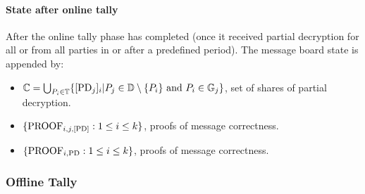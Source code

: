 \documentclass{article}
\begin{document}
\paragraph{State after online tally}

After the online tally phase has completed (once it received partial decryption for all \SetOfEncryptedPartialDecryptionKeys{} or from all parties in \SetOfFDKG{} or after a predefined period). The message board state is appended by:
\begin{itemize}
    \item $\mathbb{C} = \bigcup_{P_i \in \mathbb{T}} \{ [\mathrm{PD}_{j}]_{i} | P_{j} \in \mathbb{D} \setminus \{P_{i}\} \text{ and } P_{i} \in \mathbb{G}_{j}\}$, set of shares of partial decryption.
    \item $\{\textrm{PROOF}_{i,j,\textrm{[PD]}} : 1 \leq i \leq k\}$, proofs of message correctness. %
    \item $\{\textrm{PROOF}_{i,\textrm{PD}} : 1 \leq i \leq k\}$, proofs of message correctness. %
\end{itemize}

\subsubsection{Offline Tally}
\end{document}
